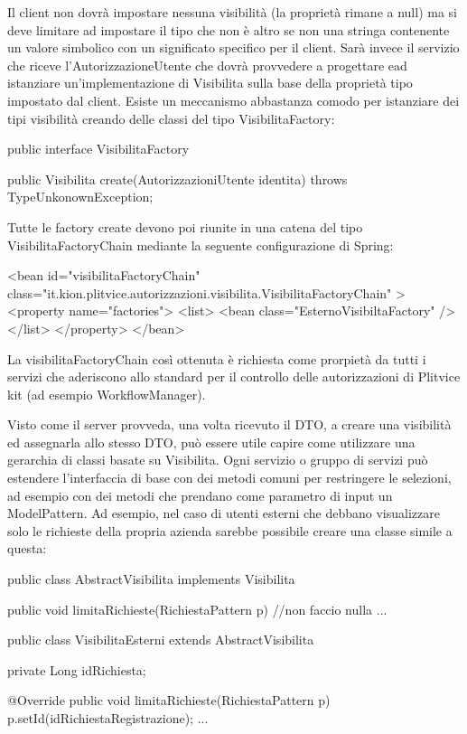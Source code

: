 Il client non dovrà impostare nessuna visibilità (la proprietà rimane a null)  ma si deve limitare ad impostare il tipo che non è altro se non una stringa contenente un valore simbolico con un significato specifico per il client.
Sarà invece il servizio che riceve l'AutorizzazioneUtente che dovrà provvedere a progettare ead istanziare un'implementazione di Visibilita sulla base della proprietà tipo impostato dal client. Esiste un meccanismo abbastanza comodo per istanziare dei tipi visibilità creando delle classi del tipo VisibilitaFactory:

\begin{java}
public interface VisibilitaFactory { 
  
  public Visibilita create(AutorizzazioniUtente identita) throws TypeUnkonownException;

} 
\end{java}


Tutte le factory create devono poi riunite in una catena del tipo VisibilitaFactoryChain mediante la seguente configurazione di Spring:

\begin{xml}
    <bean id="visibilitaFactoryChain" class="it.kion.plitvice.autorizzazioni.visibilita.VisibilitaFactoryChain" >
      <property name="factories">
        <list>
          <bean class="EsternoVisibiltaFactory"  />
        </list>
      </property>
    </bean> 
\end{xml}

La  visibilitaFactoryChain così ottenuta è richiesta come prorpietà da tutti i servizi che aderiscono allo standard per il controllo delle autorizzazioni di Plitvice kit (ad esempio WorkflowManager).

Visto come il server provveda, una volta ricevuto il DTO, a creare una visibilità ed assegnarla allo stesso DTO,  può essere utile capire come utilizzare una gerarchia di classi basate su Visibilita. Ogni servizio o gruppo di servizi può estendere  l'interfaccia di base con dei metodi comuni per restringere le selezioni, ad esempio con dei metodi che prendano come parametro di input un ModelPattern. Ad esempio, nel caso di utenti esterni  che debbano visualizzare solo le richieste della propria azienda sarebbe possibile creare una classe simile a questa:

\begin{java}
public class AbstractVisibilita implements Visibilita {

  public void limitaRichieste(RichiestaPattern p) {
    //non faccio nulla
  }
      ...
}

public class VisibilitaEsterni extends AbstractVisibilita {

  private Long idRichiesta;
  
  @Override
  public void limitaRichieste(RichiestaPattern p) {
    p.setId(idRichiestaRegistrazione);
  }
  ...
}

\end{java}


